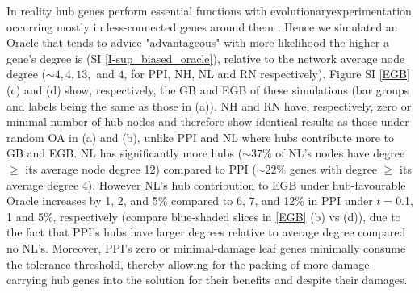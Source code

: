 			In reality hub genes perform essential functions  \cite{gerstein_architecture_2012} with evolutionaryexperimentation occurring mostly in less-connected genes around them  \cite{kim_positive_2007}. Hence we simulated an Oracle that tends to advice "advantageous" with more likelihood the higher a gene's degree is (SI \ref{I-sup_biased_oracle}), relative to the network average node degree (${\sim}4, 4, 13,$ and $4$, for PPI, NH, NL and RN respectively). Figure SI \ref{EGB} (c) and (d) show, respectively,  the GB and EGB of these simulations (bar groups and labels being the same as those in (a)). NH and RN have, respectively, zero or minimal number of hub nodes and therefore show identical results as those under random OA in (a) and (b), unlike PPI and NL where hubs contribute more to GB and EGB. NL has significantly more hubs (${\sim}37\%$ of NL's nodes have degree $\geq$ its average node degree 12) compared to PPI (${\sim}22\%$ genes with degree $\geq$ its  average degree 4). However NL's hub contribution to EGB  under hub-favourable Oracle increases by 1, 2, and 5\% compared to 6, 7, and 12\% in PPI under $t=$0.1, 1 and 5\%, respectively (compare blue-shaded slices in \ref{EGB} (b) vs (d)), due to the fact that PPI's hubs have larger degrees relative to average degree compared no NL's. Moreover, PPI's zero or minimal-damage leaf genes minimally consume the tolerance threshold, thereby allowing for the packing of more damage-carrying hub genes into the solution for their benefits and despite their damages.%
			\setlength{\textfloatsep}{0pt plus 0.0pt minus 0.0pt} \setlength{\floatsep}{0pt plus 0.0pt minus 0.0pt} \setlength{\intextsep}{5pt plus 0.0pt minus 0.0pt}

